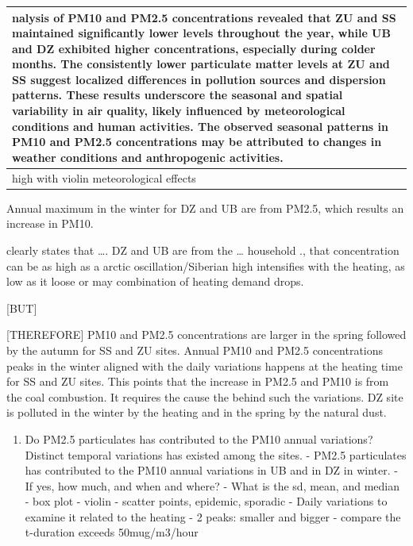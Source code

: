 \documentclass[
  11pt,
]{article}
\providecommand{\tightlist}{%
  \setlength{\itemsep}{0pt}\setlength{\parskip}{0pt}}
\begin{document}
\begin{longtable}[]{@{}l@{}}
\toprule\noalign{}
nalysis of PM10 and PM2.5 concentrations revealed that ZU and SS
maintained significantly lower levels throughout the year, while UB and
DZ exhibited higher concentrations, especially during colder months. The
consistently lower particulate matter levels at ZU and SS suggest
localized differences in pollution sources and dispersion patterns.
These results underscore the seasonal and spatial variability in air
quality, likely influenced by meteorological conditions and human
activities. The observed seasonal patterns in PM10 and PM2.5
concentrations may be attributed to changes in weather conditions and
anthropogenic activities. \\
\midrule\noalign{}
\endhead
\bottomrule\noalign{}
\endlastfoot
high with violin meteorological effects \\
\end{longtable}

Annual maximum in the winter for DZ and UB are from PM2.5, which results
an increase in PM10.

clearly states that \ldots. DZ and UB are from the \ldots{} household .,
that concentration can be as high as a arctic oscillation/Siberian high
intensifies with the heating, as low as it loose or may combination of
heating demand drops.

{[}BUT{]}

{[}THEREFORE{]} PM10 and PM2.5 concentrations are larger in the spring
followed by the autumn for SS and ZU sites. Annual PM10 and PM2.5
concentrations peaks in the winter aligned with the daily variations
happens at the heating time for SS and ZU sites. This points that the
increase in PM2.5 and PM10 is from the coal combustion. It requires the
cause the behind such the variations. DZ site is polluted in the winter
by the heating and in the spring by the natural dust.

\begin{enumerate}
\def\labelenumi{\arabic{enumi}.}
\setcounter{enumi}{2}
\tightlist
\item
  Do PM2.5 particulates has contributed to the PM10 annual variations?
  Distinct temporal variations has existed among the sites. - PM2.5
  particulates has contributed to the PM10 annual variations in UB and
  in DZ in winter. - If yes, how much, and when and where? - What is the
  sd, mean, and median - box plot - violin - scatter points, epidemic,
  sporadic - Daily variations to examine it related to the heating - 2
  peaks: smaller and bigger - compare the t-duration exceeds
  50mug/m3/hour
\end{enumerate}
\end{document}
